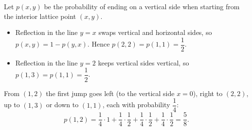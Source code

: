 Let $p(x,y)$ be the probability of ending on a vertical side when starting from the interior lattice point $(x,y)$.
\begin{itemize}
\item Reflection in the line $y=x$ swaps vertical and horizontal sides, so $p(x,y)=1-p(y,x)$. Hence $p(2,2)=p(1,1)=\dfrac12$.
\item Reflection in the line $y=2$ keeps vertical sides vertical, so $p(1,3)=p(1,1)=\dfrac12$.
\end{itemize}
From $(1,2)$ the first jump goes left (to the vertical side $x=0$), right to $(2,2)$, up to $(1,3)$ or down to $(1,1)$, each with probability $\dfrac14$:
\[p(1,2)=\dfrac14\cdot1+\dfrac14\cdot\dfrac12+\dfrac14\cdot\dfrac12+\dfrac14\cdot\dfrac12=\boxed{\dfrac58}.\]
